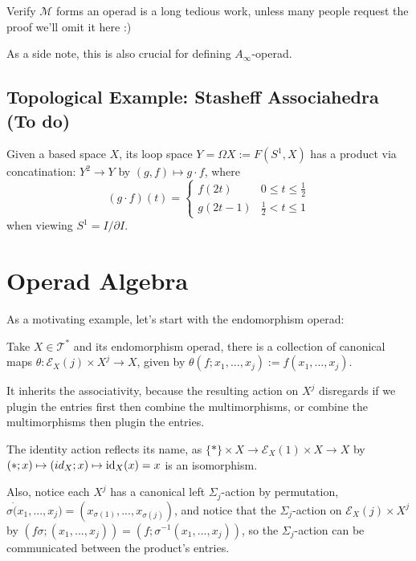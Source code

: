\documentclass{article}
\begin{document}
Verify $\mathcal{M}$ forms an operad is a long tedious work, unless many people request the proof we'll omit it here :)

As a side note, this is also crucial for defining $A_\infty$-operad.

\hfil

\subsection{Topological Example: Stasheff Associahedra (To do)}

Given a based space $X$, its loop space $Y=\Omega X := F(S^1, X)$ has a product via concatination: $Y^2\rightarrow Y$ by $(g,f)\mapsto g\cdot f$, where 
\[(g\cdot f)(t)=\begin{cases}
    f(2t) & 0\leq t\leq \frac{1}{2}\\
    g(2t-1) & \frac{1}{2}<t\leq 1
\end{cases}\]
when viewing $S^1 = I/\partial I$.

\newpage

\section{Operad Algebra}

As a motivating example, let's start with the endomorphism operad:
\begin{exmp}
    Take $X\in\mathcal{T}^*$ and its endomorphism operad, there is a collection of canonical maps $\theta:\mathcal{E}_X (j)\times X^j\rightarrow X$, given by $\theta(f;x_1,...,x_j):= f(x_1,...,x_j)$.

    It inherits the associativity, because the resulting action on $X^j$ disregards if we plugin the entries first then combine the multimorphisms, or combine the multimorphisms then plugin the entries.

    The identity action reflects its name, as $\{*\}\times X\rightarrow\mathcal{E}_X (1)\times X\rightarrow X$ by $(*;x)\mapsto (id_X;x)\mapsto \mathrm{id}_X (x)=x$ is an isomorphism.

    Also, notice each $X^j$ has a canonical left $\Sigma_j$-action by permutation, $\sigma\dot (x_1,...,x_j)= (x_{\sigma(1)},...,x_{\sigma(j)})$, and notice that the $\Sigma_j$-action on $\mathcal{E}_X (j)\times X^j$ by $(f \sigma; (x_1,...,x_j)) = (f; \sigma^{-1}(x_1,...,x_j))$, so the $\Sigma_j$-action can be communicated between the product's entries.
\end{exmp}
\end{document}
